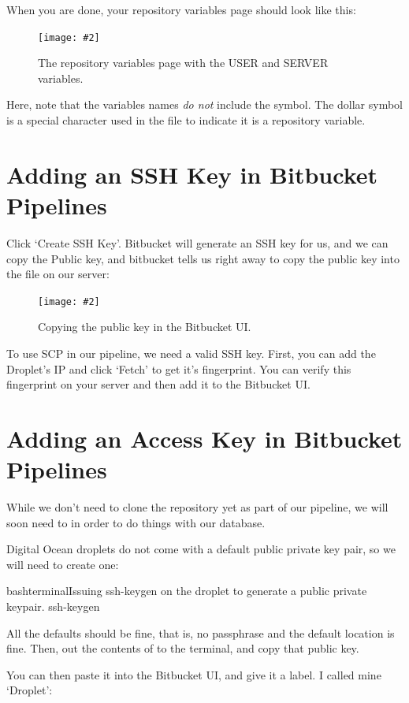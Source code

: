 \documentclass[a4paper,headinclude=on,footinclude=on,12pt,oneside]{scrbook}
\newcommand{\standardfigure}[3]{\begin{figure}[H]\begin{center}\texttt{[image: \#2]}\caption{#3}\label{fig:#2}\end{center}\end{figure}}
\newcommand{\dollar}{\$}
\begin{document}
When you are done, your repository variables page should look like this:

\standardfigure{\textwidth}{/backend/repository-variables-page}{The repository variables page with the USER and SERVER variables.}

Here, note that the variables names \textit{do not} include the \codeword{\dollar} symbol. The dollar symbol is a special character used in the  file to indicate it is a repository variable.

\section{Adding an SSH Key in Bitbucket Pipelines}

Click `Create SSH Key'. Bitbucket will generate an SSH key for us, and we can copy the Public key, and bitbucket tells us right away to copy the public key into the  file on our server:

\standardfigure{\textwidth}{backend/bitbucket/ssh-key-ui}{Copying the public key in the Bitbucket UI.}

To use SCP in our pipeline, we need a valid SSH key. First, you can add the Droplet's IP and click `Fetch' to get it's fingerprint. You can verify this fingerprint on your server and then add it to the Bitbucket UI.

\section{Adding an Access Key in Bitbucket Pipelines}

While we don't need to clone the repository yet as part of our pipeline, we will soon need to in order to do things with our database.

Digital Ocean droplets do not come with a default public private key pair, so we will need to create one:

\begin{codeInput}{bash}{terminal}{Issuing ssh-keygen on the droplet to generate a public private keypair.}
ssh-keygen
\end{codeInput}

All the defaults should be fine, that is, no passphrase and the default  location is fine. Then,  out the contents of  to the terminal, and copy that public key.

You can then paste it into the Bitbucket UI, and give it a label. I called mine `Droplet':
\end{document}
